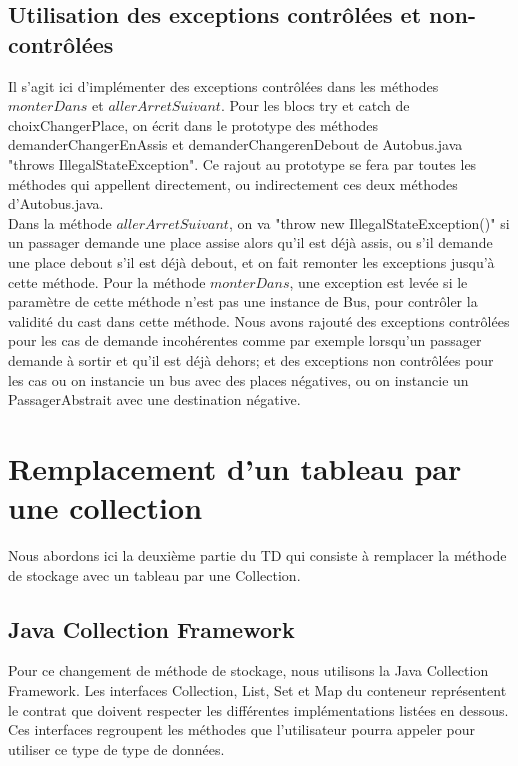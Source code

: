 \documentclass[a4paper,11pt]{article}
\begin{document}
\subsection{Utilisation des exceptions contrôlées et non-contrôlées}
Il s'agit ici d'implémenter des exceptions contrôlées dans les méthodes $monterDans$ et $allerArretSuivant$. Pour les blocs try et catch de choixChangerPlace, on écrit dans le prototype des méthodes demanderChangerEnAssis et demanderChangerenDebout de Autobus.java "throws IllegalStateException". Ce rajout au prototype se fera par toutes les méthodes qui appellent directement, ou indirectement ces deux méthodes d'Autobus.java. \\
Dans la méthode $allerArretSuivant$, on va "throw new IllegalStateException()" si un passager demande une place assise alors qu'il est déjà assis, ou s'il demande une place debout s'il est déjà debout, et on fait remonter les exceptions jusqu'à cette méthode. Pour la méthode $monterDans$, une exception est levée si le paramètre de cette méthode n'est pas une instance de Bus, pour contrôler la validité du cast dans cette méthode.
Nous avons rajouté des exceptions contrôlées pour les cas de demande incohérentes comme par exemple lorsqu'un passager demande à sortir et qu'il est déjà dehors; et des exceptions non contrôlées pour les cas ou on instancie un bus avec des places négatives, ou on instancie un PassagerAbstrait avec une destination négative. \\

\section{Remplacement d'un tableau par une collection}
Nous abordons ici la deuxième partie du TD qui consiste à remplacer la méthode de stockage avec un tableau par une Collection.

\subsection{Java Collection Framework}

Pour ce changement de méthode de stockage, nous utilisons la Java Collection Framework. Les interfaces Collection, List, Set et Map du conteneur représentent le contrat que doivent respecter les différentes implémentations listées en dessous. Ces interfaces regroupent les méthodes que l'utilisateur pourra appeler pour utiliser ce type de type de données.\\
\end{document}
